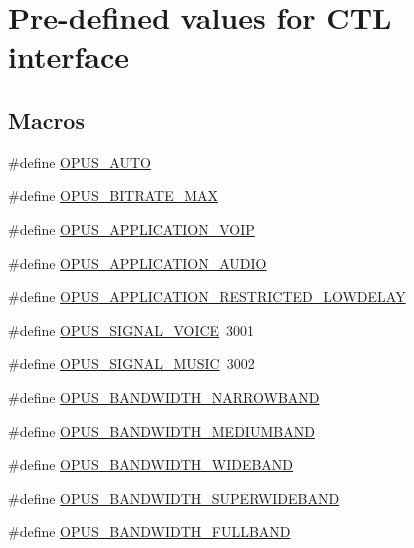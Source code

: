 \hypertarget{group__opus__ctlvalues}{}\section{Pre-\/defined values for C\+TL interface}
\label{group__opus__ctlvalues}
\subsection*{Macros}
\begin{DoxyCompactItemize}
\item 
\#define \mbox{\hyperlink{group__opus__ctlvalues_ga1c5b3244b018ff4548d2d6bffa418472}{O\+P\+U\+S\+\_\+\+A\+U\+TO}}
\item 
\#define \mbox{\hyperlink{group__opus__ctlvalues_gaeadbaa3b4b9e15d39cd1d6e7d91519e5}{O\+P\+U\+S\+\_\+\+B\+I\+T\+R\+A\+T\+E\+\_\+\+M\+AX}}
\item 
\#define \mbox{\hyperlink{group__opus__ctlvalues_ga07884aa018303a419d1f7acb2f3fa669}{O\+P\+U\+S\+\_\+\+A\+P\+P\+L\+I\+C\+A\+T\+I\+O\+N\+\_\+\+V\+O\+IP}}
\item 
\#define \mbox{\hyperlink{group__opus__ctlvalues_ga5909f7cb35c04f1110026c6889edd345}{O\+P\+U\+S\+\_\+\+A\+P\+P\+L\+I\+C\+A\+T\+I\+O\+N\+\_\+\+A\+U\+D\+IO}}
\item 
\#define \mbox{\hyperlink{group__opus__ctlvalues_ga592232fb39db60c1369989c5c5d19a07}{O\+P\+U\+S\+\_\+\+A\+P\+P\+L\+I\+C\+A\+T\+I\+O\+N\+\_\+\+R\+E\+S\+T\+R\+I\+C\+T\+E\+D\+\_\+\+L\+O\+W\+D\+E\+L\+AY}}
\item 
\#define \mbox{\hyperlink{group__opus__ctlvalues_ga085a116fed816373d3b9eae28df49404}{O\+P\+U\+S\+\_\+\+S\+I\+G\+N\+A\+L\+\_\+\+V\+O\+I\+CE}}~3001
\item 
\#define \mbox{\hyperlink{group__opus__ctlvalues_gaa0c228c664b6d426f4c213e3a5350889}{O\+P\+U\+S\+\_\+\+S\+I\+G\+N\+A\+L\+\_\+\+M\+U\+S\+IC}}~3002
\item 
\#define \mbox{\hyperlink{group__opus__ctlvalues_ga607dd310958b9c7d545d005e4572d47f}{O\+P\+U\+S\+\_\+\+B\+A\+N\+D\+W\+I\+D\+T\+H\+\_\+\+N\+A\+R\+R\+O\+W\+B\+A\+ND}}
\item 
\#define \mbox{\hyperlink{group__opus__ctlvalues_ga53a2aff4dc0ee23682927ca568c422a3}{O\+P\+U\+S\+\_\+\+B\+A\+N\+D\+W\+I\+D\+T\+H\+\_\+\+M\+E\+D\+I\+U\+M\+B\+A\+ND}}
\item 
\#define \mbox{\hyperlink{group__opus__ctlvalues_gac698e5d1281a3632251d2a4ead48afb9}{O\+P\+U\+S\+\_\+\+B\+A\+N\+D\+W\+I\+D\+T\+H\+\_\+\+W\+I\+D\+E\+B\+A\+ND}}
\item 
\#define \mbox{\hyperlink{group__opus__ctlvalues_ga41f86df35af0033a7361895da88671c1}{O\+P\+U\+S\+\_\+\+B\+A\+N\+D\+W\+I\+D\+T\+H\+\_\+\+S\+U\+P\+E\+R\+W\+I\+D\+E\+B\+A\+ND}}
\item 
\#define \mbox{\hyperlink{group__opus__ctlvalues_ga74cb052d8ec36cbcc9708c417558ebdd}{O\+P\+U\+S\+\_\+\+B\+A\+N\+D\+W\+I\+D\+T\+H\+\_\+\+F\+U\+L\+L\+B\+A\+ND}}
\end{DoxyCompactItemize}



